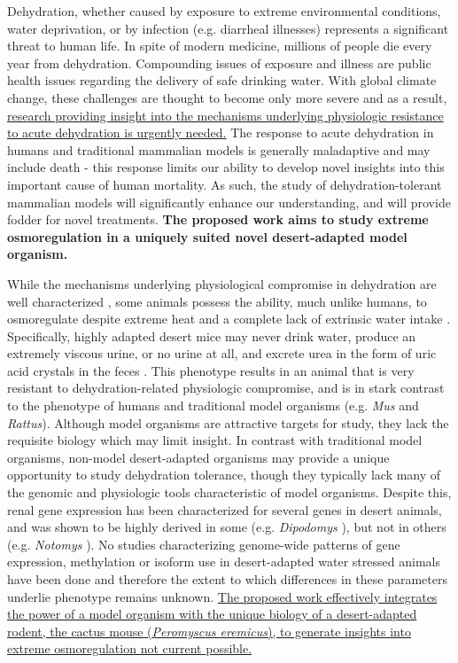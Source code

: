 \documentclass[11pt]{article}
\begin{document}
Dehydration, whether caused by exposure to extreme environmental conditions, water deprivation, or by infection (e.g. diarrheal illnesses) represents a significant threat to human life. In spite of modern medicine, millions of people die every year from dehydration. Compounding issues of exposure and illness are public health issues regarding the delivery of safe drinking water. With global climate change, these challenges are thought to become only more severe and as a result, \ul{research providing insight into the mechanisms underlying physiologic resistance to acute dehydration is urgently needed.} The response to acute dehydration in humans and traditional mammalian models is generally maladaptive and may include death - this response limits our ability to develop novel insights into this important cause of human mortality. As such, the study of dehydration-tolerant mammalian models will significantly enhance our understanding, and will provide fodder for novel treatments. \textbf{The proposed work aims to study extreme osmoregulation in a uniquely suited novel desert-adapted model organism.}

While the mechanisms underlying physiological compromise in dehydration are well characterized \citep{Roberts:2010fl}, some animals possess the ability, much unlike humans, to osmoregulate despite extreme heat and a complete lack of extrinsic water intake \citep{NAGY:1994ta}. Specifically, highly adapted desert mice may never drink water, produce an extremely viscous urine, or no urine at all, and excrete urea in the form of uric acid crystals in the feces \citep{SCHMIDTNIELSEN:1952wi}. This phenotype results in an animal that is very resistant to dehydration-related physiologic compromise, and is in stark contrast to the phenotype of humans and traditional model organisms (e.g. \textit{Mus} and \textit{Rattus}). Although model organisms are attractive targets for study, they lack the requisite biology which may limit insight. In contrast with traditional model organisms, non-model desert-adapted organisms may provide a unique opportunity to study dehydration tolerance, though they typically lack many of the genomic and physiologic tools characteristic of model organisms. Despite this, renal gene expression has been characterized for several genes in desert animals, and was shown to be highly derived in some (e.g. \textit{Dipodomys} \citep{Huang:2001ti}), but not in others (e.g. \textit{Notomys} \cite{Weaver:1994wv}). No studies characterizing genome-wide patterns of gene expression, methylation or isoform use in desert-adapted water stressed animals have been done and therefore the extent to which differences in these parameters underlie phenotype remains unknown. \ul{The proposed work effectively integrates the power of a model organism with the unique biology of a desert-adapted rodent, the cactus mouse (\textit{Peromyscus eremicus}), to generate insights into extreme osmoregulation not current possible.}
\end{document}
